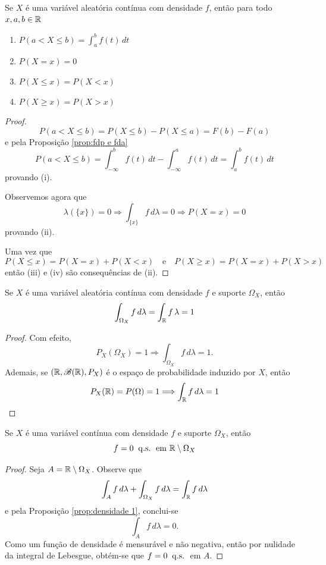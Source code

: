 \begin{thm:prob continua}
\label{thm:prob continua}
Se $X$ é uma variável aleatória contínua com densidade $f$,
então para todo $x, a, b \in \mathbb{R}$
\begin{enumerate}
	\item[i.] $P(a < X \leq b) = \int_a^b f(t)\,dt$
	\item[ii.] $P(X = x) = 0$
	\item[iii.] $P(X \leq x) = P(X < x)$
	\item[iv.] $P(X \geq x) = P(X > x)$
\end{enumerate}
\begin{proof}
	\[
		P(a < X \le b) = P(X \le b) - P(X \le a) = F(b) - F(a)
	\]
	e pela Proposição \ref{prop:fdp e fda}
	\[
		P(a < X \le b) = \int_{-\infty}^b f(t)\,dt - \int_{-\infty}^a f(t)\,dt = \int_a^b f(t)\,dt
	\]
	provando (i).

	Observemos agora que
	\[
		\lambda(\{x\}) = 0 \Longrightarrow \int_{\{x\}} f\, d\lambda = 0 \Longrightarrow P(X = x) = 0
	\]
	provando (ii).

	Uma vez que
	\[
		P(X \leq x) = P(X = x) + P(X < x) \quad \text{e} \quad P(X \ge x) = P(X = x) + P(X > x)
	\]
	então (iii) e (iv) são consequências de (ii).
\end{proof}
\end{thm:prob continua}

\begin{prop:densidade 1}
\label{prop:densidade 1}
Se $X$ é uma variável aleatória contínua com densidade $f$ e suporte $\Omega_X$, então
\[
	\int_{\Omega_X} f\,d\lambda = \int_{\mathbb{R}} f\,\lambda = 1
\]
\begin{proof}
	Com efeito,
	\[
		P_X(\Omega_X) = 1 \Longrightarrow \int_{\Omega_X}f\, d\lambda = 1.
	\]
	Ademais, se $(\mathbb{R}, \mathcal{B}(\mathbb{R}), P_X)$ é o espaço de probabilidade induzido por
	$X$, então
	\[
		P_X(\mathbb{R}) = P(\Omega) = 1 \Longrightarrow \int_{\mathbb{R}} f\, d\lambda = 1
	\]
\end{proof}
\end{prop:densidade 1}

\begin{prop:densidade fora suporte}
Se $X$ é uma variável contínua com densidade $f$ e suporte $\Omega_X$, então
\[
	f = 0 \;\;\mathrm{q.s.}\; \text{ em } \mathbb{R} \setminus \Omega_X
\]
\begin{proof}
	Seja $A = \mathbb{R} \setminus \Omega_X$. Observe que
	\[
		\int_{A} f\, d\lambda + \int_{\Omega_X} f\, d\lambda = \int_{\mathbb{R}} f\, d\lambda
	\]
	e pela Proposição \ref{prop:densidade 1}, conclui-se
	\[
		\int_A f\, d\lambda = 0.
	\]
	Como um função de densidade é mensurável e não negativa, então por nulidade
	da integral de Lebesgue, obtém-se que $f = 0 \;\;\mathrm{q.s.}\;$ em $A$.
\end{proof}
\end{prop:densidade fora suporte}

